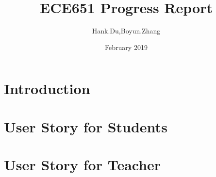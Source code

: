 \documentclass{article}
\title{ECE651 Progress Report}
\author{Hank.Du,Boyun.Zhang }
\date{February 2019}
\begin{document}
\maketitle

\section{Introduction}

\section{User Story for Students}


\section{User Story for Teacher}

\end{document}
